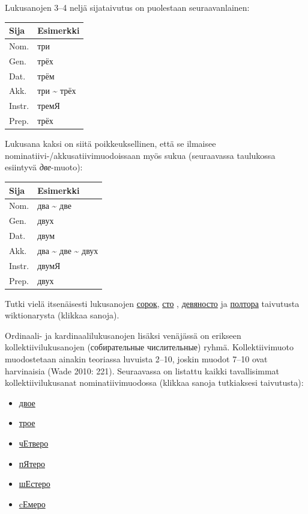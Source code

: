\documentclass[]{scrreprt}
\providecommand{\tightlist}{%
  \setlength{\itemsep}{0pt}\setlength{\parskip}{0pt}}
\begin{document}
Lukusanojen 3--4 neljä sijataivutus on puolestaan seuraavanlainen:

\begin{longtable}[c]{@{}ll@{}}
\toprule
Sija & Esimerkki\tabularnewline
\midrule
\endhead
Nom. & три\tabularnewline
Gen. & трёх\tabularnewline
Dat. & трём\tabularnewline
Akk. & три \textasciitilde{} трёх\tabularnewline
Instr. & тремЯ\tabularnewline
Prep. & трёх\tabularnewline
\bottomrule
\end{longtable}

Lukusana kaksi on siitä poikkeuksellinen, että se ilmaisee
nominatiivi-/akkusatiivimuodoissaan myös sukua (seuraavassa taulukossa
esiintyvä \emph{две}-muoto):

\begin{longtable}[c]{@{}ll@{}}
\toprule
Sija & Esimerkki\tabularnewline
\midrule
\endhead
Nom. & два \textasciitilde{} две\tabularnewline
Gen. & двух\tabularnewline
Dat. & двум\tabularnewline
Akk. & два \textasciitilde{} две \textasciitilde{} двух\tabularnewline
Instr. & двумЯ\tabularnewline
Prep. & двух\tabularnewline
\bottomrule
\end{longtable}

Tutki vielä itsenäisesti lukusanojen
\href{https://ru.wiktionary.org/wiki/\%D1\%81\%D0\%BE\%D1\%80\%D0\%BE\%D0\%BA}{сорок},
\href{https://ru.wiktionary.org/wiki/\%D1\%81\%D1\%82\%D0\%BE}{сто} ,
\href{https://ru.wiktionary.org/wiki/\%D0\%B4\%D0\%B5\%D0\%B2\%D1\%8F\%D0\%BD\%D0\%BE\%D1\%81\%D1\%82\%D0\%BE}{девяносто}
ja
\href{https://ru.wiktionary.org/wiki/\%D0\%BF\%D0\%BE\%D0\%BB\%D1\%82\%D0\%BE\%D1\%80\%D0\%B0}{полтора}
taivutusta wiktionarysta (klikkaa sanoja).

Ordinaali- ja kardinaalilukusanojen lisäksi venäjässä on erikseen
kollektiivilukusanojen (собирательные числительные) ryhmä.
Kollektiivimuoto muodostetaan ainakin teoriassa luvuista 2--10, joskin
muodot 7--10 ovat harvinaisia (Wade 2010: 221). Seuraavassa on listattu
kaikki tavallisimmat kollektiivilukusanat nominatiivimuodossa (klikkaa
sanoja tutkiaksesi taivutusta):

\begin{itemize}
\tightlist
\item
  \href{https://ru.wiktionary.org/wiki/\%D0\%B4\%D0\%B2\%D0\%BE\%D0\%B5}{двое}
\item
  \href{https://ru.wiktionary.org/wiki/\%D1\%82\%D1\%80\%D0\%BE\%D0\%B5}{трое}
\item
  \href{https://ru.wiktionary.org/wiki/\%D1\%87\%D0\%B5\%D1\%82\%D0\%B2\%D0\%B5\%D1\%80\%D0\%BE}{чЕтверо}
\item
  \href{https://ru.wiktionary.org/wiki/\%D0\%BF\%D1\%8F\%D1\%82\%D0\%B5\%D1\%80\%D0\%BE}{пЯтеро}
\item
  \href{https://ru.wiktionary.org/wiki/\%D1\%88\%D0\%B5\%D1\%81\%D1\%82\%D0\%B5\%D1\%80\%D0\%BE}{шЕстеро}
\item
  \href{https://ru.wiktionary.org/wiki/cемеро}{cЕмеро}
\end{itemize}
\end{document}
